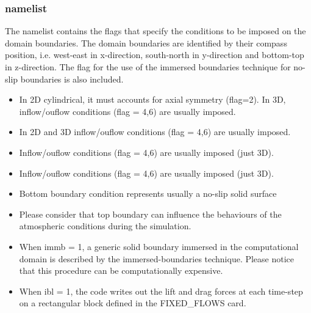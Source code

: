 \subsubsection{ namelist}
The  namelist contains the flags that specify the
conditions to be imposed on the domain boundaries. The domain boundaries
are identified by their compass position, i.e. west-east in x-direction,
south-north in y-direction and bottom-top in z-direction. The flag for the
use of the immersed boundaries technique for no-slip boundaries is also
included.
\begin{itemize}
\item
{}
{In 2D cylindrical, it must accounts for axial symmetry (flag=2). In 3D, 
inflow/ouflow conditions (flag = 4,6) are usually imposed.}

\item
{}
{In 2D and 3D inflow/ouflow conditions (flag = 4,6) are usually imposed.}

\item
{}
{Inflow/ouflow conditions (flag = 4,6) are usually imposed (just 3D).}

\item
{}
{Inflow/ouflow conditions (flag = 4,6) are usually imposed (just 3D).}

\item
{}
{Bottom boundary condition represents usually a no-slip solid surface}

\item
{}
{Please consider that top boundary can influence the behaviours of
the atmospheric conditions during the simulation.}

\item
{}
{When immb = 1, a generic solid boundary immersed in the computational domain
is described by the immersed-boundaries technique. Please notice that this 
procedure can be computationally expensive.}

\item
{}
{When ibl = 1, the code writes out the lift and drag forces at each time-step
on a rectangular block defined in the FIXED\_FLOWS card.}

\end{itemize}

